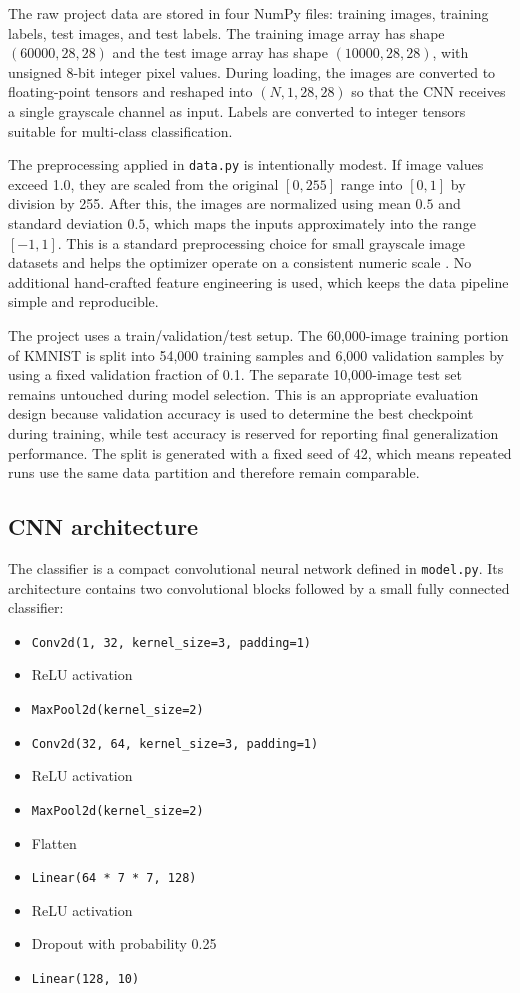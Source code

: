 \documentclass[conference]{IEEEtran}
\begin{document}
The raw project data are stored in four NumPy files: training images, training labels, test images, and test labels. The training image array has shape $(60000, 28, 28)$ and the test image array has shape $(10000, 28, 28)$, with unsigned 8-bit integer pixel values. During loading, the images are converted to floating-point tensors and reshaped into $(N, 1, 28, 28)$ so that the CNN receives a single grayscale channel as input. Labels are converted to integer tensors suitable for multi-class classification.

The preprocessing applied in \texttt{data.py} is intentionally modest. If image values exceed 1.0, they are scaled from the original $[0, 255]$ range into $[0, 1]$ by division by 255. After this, the images are normalized using mean $0.5$ and standard deviation $0.5$, which maps the inputs approximately into the range $[-1, 1]$. This is a standard preprocessing choice for small grayscale image datasets and helps the optimizer operate on a consistent numeric scale \cite{goodfellow2016}. No additional hand-crafted feature engineering is used, which keeps the data pipeline simple and reproducible.

The project uses a train/validation/test setup. The 60{,}000-image training portion of KMNIST is split into 54{,}000 training samples and 6{,}000 validation samples by using a fixed validation fraction of 0.1. The separate 10{,}000-image test set remains untouched during model selection. This is an appropriate evaluation design because validation accuracy is used to determine the best checkpoint during training, while test accuracy is reserved for reporting final generalization performance. The split is generated with a fixed seed of 42, which means repeated runs use the same data partition and therefore remain comparable.

\subsection{CNN architecture}

The classifier is a compact convolutional neural network defined in \texttt{model.py}. Its architecture contains two convolutional blocks followed by a small fully connected classifier:

\begin{itemize}
    \item \texttt{Conv2d(1, 32, kernel\_size=3, padding=1)}
    \item ReLU activation
    \item \texttt{MaxPool2d(kernel\_size=2)}
    \item \texttt{Conv2d(32, 64, kernel\_size=3, padding=1)}
    \item ReLU activation
    \item \texttt{MaxPool2d(kernel\_size=2)}
    \item Flatten
    \item \texttt{Linear(64 * 7 * 7, 128)}
    \item ReLU activation
    \item Dropout with probability 0.25
    \item \texttt{Linear(128, 10)}
\end{itemize}
\end{document}
